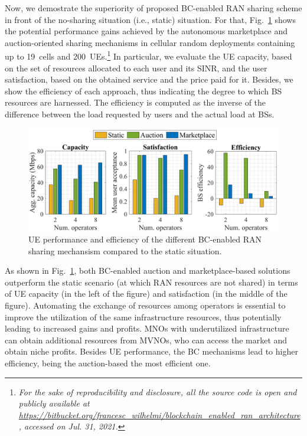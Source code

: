 \documentclass[journal]{IEEEtran}
\begin{document}
Now, we demostrate the superiority of proposed BC-enabled RAN sharing scheme in front of the no-sharing situation (i.e., static) situation. For that, Fig.~\ref{fig:performance} shows the potential performance gains achieved by the autonomous marketplace and auction-oriented sharing mechanisms in cellular random deployments containing up to 19~cells and 200~UEs.\footnote{\textit{For the sake of reproducibility and disclosure, all the source code is open and publicly available at \url{https://bitbucket.org/francesc_wilhelmi/blockchain_enabled_ran_architecture}, accessed on Jul. 31, 2021.}} In particular, we evaluate the UE capacity, based on the set of resources allocated to each user and its SINR, and the user satisfaction, based on the obtained service and the price paid for it. Besides, we show the efficiency of each approach, thus indicating the degree to which BS resources are harnessed. The efficiency is computed as the inverse of the difference between the load requested by users and the actual load at BSs.

\begin{figure}[ht!]
\centering
\includegraphics[width=1\linewidth]{performance_results.png}
\caption{UE performance and efficiency of the different BC-enabled RAN sharing mechansism compared to the static situation.}
\label{fig:performance}
\end{figure}

As shown in Fig.~\ref{fig:performance}, both BC-enabled auction and marketplace-based solutions outperform the static scenario (at which RAN resources are not shared) in terms of UE capacity (in the left of the figure) and satisfaction (in the middle of the figure). Automating the exchange of resources among operators is essential to improve the utilization of the same infrastructure resources, thus potentially leading to increased gains and profits. MNOs with underutilized infrastructure can obtain additional resources from MVNOs, who can access the market and obtain niche profits. Besides UE performance, the BC mechanisms lead to higher efficiency, being the auction-based the most efficient one.
\end{document}
